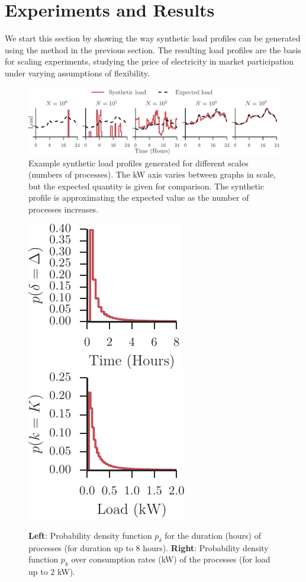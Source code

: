 \documentclass[conference]{IEEEtran}
\begin{document}

\section{Experiments and Results}
\label{sec:Experiments}
We start this section by showing the way synthetic load profiles can be generated using the method in the previous section. The resulting load profiles are the basis for scaling experiments, studying the price of electricity in market participation under varying assumptions of flexibility.


\begin{figure}[t!]
\centering
\includegraphics[]{figures/slps.pdf}
\caption{Example synthetic load profiles generated for different scales (numbers of processes). The kW axis varies between graphs in scale, but the expected quantity is given for comparison. The synthetic profile is approximating the expected value as the number of processes increases.}
\label{fig:art_slps}
\end{figure}

\begin{figure}[t!]
\centering
\includegraphics[width=0.35\columnwidth]{figures/delta.pdf}~\includegraphics[width=0.35\columnwidth]{figures/kappa.pdf}
\caption{\textbf{Left}: Probability density function $p_{\delta}$ for the duration (hours) of processes (for duration up to $8$ hours). \textbf{Right}: Probability density function $p_k$ over consumption rates (kW) of the processes (for load up to $2$ kW).}
\label{fig:devide-time-consumption}
\end{figure}
\end{document}
